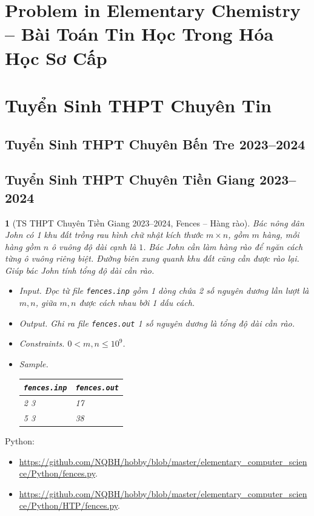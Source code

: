 \documentclass{article}
\newtheorem{baitoan}{}
\begin{document}

\section{Problem in Elementary Chemistry -- Bài Toán Tin Học Trong Hóa Học Sơ Cấp}


\section{Tuyển Sinh THPT Chuyên Tin}

\subsection{Tuyển Sinh THPT Chuyên Bến Tre 2023--2024}

\subsection{Tuyển Sinh THPT Chuyên Tiền Giang 2023--2024}

\begin{baitoan}[TS THPT Chuyên Tiền Giang 2023--2024, Fences -- Hàng rào]
	Bác nông dân John có 1 khu đất trồng rau hình chữ nhật kích thước $m\times n$, gồm $m$ hàng, mỗi hàng gồm $n$ ô vuông độ dài cạnh là $1$. Bác John cần làm hàng rào để ngăn cách từng ô vuông riêng biệt. Đường biên xung quanh  khu đất cũng cần được rào lại. Giúp bác John tính tổng độ dài cần rào.
	\begin{itemize}
		\item {\sf Input.} Đọc từ file \verb|fences.inp| gồm 1 dòng chứa 2 số nguyên dương lần lượt là $m,n$, giữa $m,n$ được cách nhau bởi 1 dấu cách.
		\item {\sf Output.} Ghi ra file \verb|fences.out| 1 số nguyên dương là tổng độ dài cần rào.
		\item {\sf Constraints.} $0 < m,n\le10^9$.
		\item {\sf Sample.}
		\begin{table}[H]
			\centering
			\begin{tabular}{|l|l|}
				\hline
				{\tt fences.inp} & {\tt fences.out} \\
				\hline
				2 3 & 17 \\
				\hline
				5 3 & 38 \\
				\hline
			\end{tabular}
		\end{table}
	\end{itemize}
\end{baitoan}
Python:
\begin{itemize}
	\item \url{https://github.com/NQBH/hobby/blob/master/elementary_computer_science/Python/fences.py}.
	\item \url{https://github.com/NQBH/hobby/blob/master/elementary_computer_science/Python/HTP/fences.py}.
\end{itemize}
\end{document}
